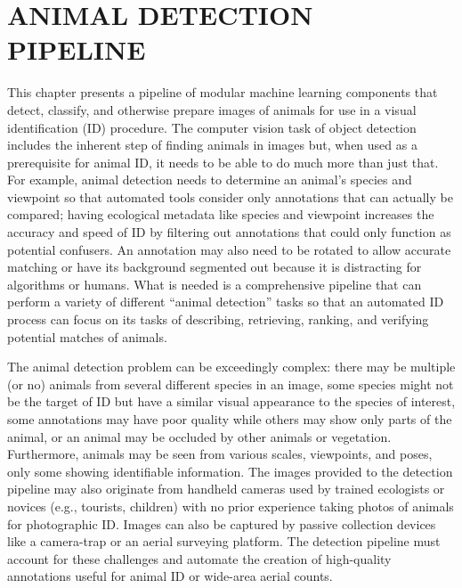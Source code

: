 \chapter{ANIMAL DETECTION PIPELINE} \label{chapter:detection}

\noindent This chapter presents a pipeline of modular machine learning components that detect, classify, and otherwise prepare images of animals for use in a visual identification (ID) procedure.  The computer vision task of object detection includes the inherent step of finding animals in images but, when used as a prerequisite for animal ID, it needs to be able to do much more than just that.  For example, animal detection needs to determine an animal's species and viewpoint so that automated tools consider only annotations that can actually be compared; having ecological metadata like species and viewpoint increases the accuracy and speed of ID by filtering out annotations that could only function as potential confusers.  An annotation may also need to be rotated to allow accurate matching or have its background segmented out because it is distracting for algorithms or humans.  What is needed is a comprehensive pipeline that can perform a variety of different ``animal detection'' tasks so that an automated ID process can focus on its tasks of describing, retrieving, ranking, and verifying potential matches of animals.

The animal detection problem can be exceedingly complex: there may be multiple (or no) animals from several different species in an image, some species might not be the target of ID but have a similar visual appearance to the species of interest, some annotations may have poor quality while others may show only parts of the animal, or an animal may be occluded by other animals or vegetation.  Furthermore, animals may be seen from various scales, viewpoints, and poses, only some showing identifiable information.  The images provided to the detection pipeline may also originate from handheld cameras used by trained ecologists or novices (e.g., tourists, children) with no prior experience taking photos of animals for photographic ID.  Images can also be captured by passive collection devices like a camera-trap or an aerial surveying platform.  The detection pipeline must account for these challenges and automate the creation of high-quality annotations useful for animal ID or wide-area aerial counts.

